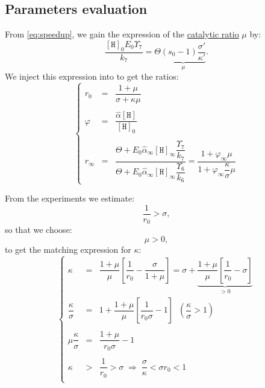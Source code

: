 \documentclass[aps,onecolumn,11pt]{revtex4}
\newcommand{\mychem}[1]{\mathtt{#1}}
\newcommand{\myconc}[1]{\left\lbrack{#1}\right\rbrack}
\newcommand{\spproton}{\mychem{H}}
\newcommand{\proton}{\myconc{\spproton}}
\begin{document}
\subsection{Parameters evaluation}
From \eqref{eq:speedup}, we gain the expression of the \underline{catalytic ratio} $\mu$ by:
\begin{equation}
\label{eq:mu_def}
	\dfrac{\proton_0 E_0 \Upsilon_7}{k_7} = \Theta \underbrace{\left(s_0-1\right) 
	\dfrac{ \sigma' }{\kappa'}}_{\mu}.
\end{equation}
We inject this expression into to get the ratios:
\begin{equation}
\left\lbrace
\begin{array}{rcl}
	r_0 & = & \dfrac{1+\mu}{\sigma+\kappa\mu}\\
	\\
	\varphi & = &   \dfrac{\hat\alpha \proton}{\proton_0}\\
	\\
	r_\infty & = &
	 \dfrac{\Theta + E_0 \hat\alpha_\infty \proton_\infty \dfrac{\Upsilon_7}{k_7} }
	 {\Theta + E_0 \hat\alpha_\infty \proton_\infty \dfrac{\Upsilon_6}{k_6}}
	 =\dfrac{1 + \varphi_\infty \mu }{1+ \varphi_\infty \dfrac{\kappa}{\sigma}\mu}
\end{array}
\right.
\end{equation}

From the experiments we estimate:
\begin{equation}
\dfrac{1}{r_0}  >  \sigma,
\end{equation}
so that we choose:
\begin{equation}
\mu > 0,
\end{equation}
to get the matching expression for $\kappa$:
\begin{equation}
\left\lbrace
\begin{array}{rcl}
	\kappa  & = &  \dfrac{1+\mu}{\mu}\left[\dfrac{1}{r_0} - \dfrac{\sigma}{1+\mu}\right] 
	=  \sigma + \underbrace{\dfrac{1+\mu}{\mu}\left[ \dfrac{1}{r_0} - \sigma \right]}_{>0}\\
	\dfrac{\kappa}{\sigma} & = & 1 + {\dfrac{1+\mu}{\mu}\left[ \dfrac{1}{r_0\sigma} - 1\right]} \;\; \left(\dfrac{\kappa}{\sigma}> 1\right)\\
	\\
	\mu \dfrac{\kappa}{\sigma} & = & \dfrac{1+\mu}{r_0\sigma} - 1\\
	\\
 \kappa & > & \dfrac{1}{r_0} > \sigma \;\Rightarrow\; \dfrac{\sigma}{\kappa} < \sigma r_0 < 1\\
\end{array}
\right.
\end{equation}
\end{document}
